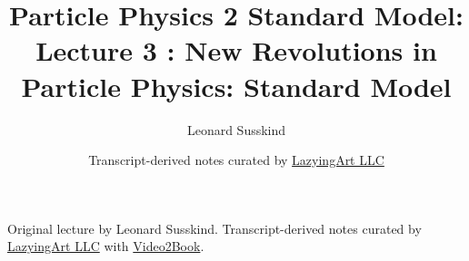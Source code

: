 \documentclass[11pt,oneside]{book}
\begin{document}
\frontmatter
\title{Particle Physics 2 Standard Model: Lecture 3 : New Revolutions in Particle Physics: Standard Model}
\author{Leonard Susskind}
\date{Transcript-derived notes curated by \href{https://lazying.art}{LazyingArt LLC}}
\maketitle
\begin{center}
\small Original lecture by Leonard Susskind. Transcript-derived notes curated by \href{https://lazying.art}{LazyingArt LLC} with \href{https://github.com/lachlanchen/Video2Book}{Video2Book}.
\end{center}
\clearpage
\mainmatter

\end{document}
